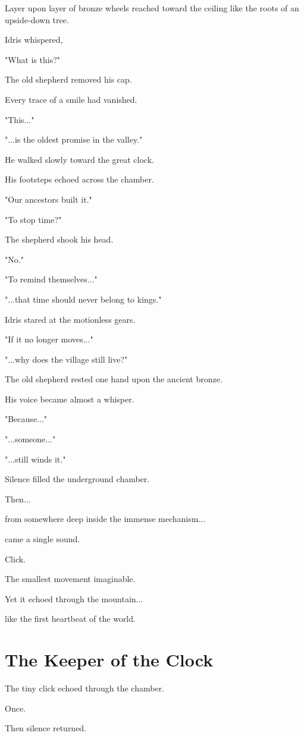 \documentclass[12pt,openany]{book}
\begin{document}
Layer upon layer of bronze wheels reached toward the ceiling like the roots of an upside-down tree.

Idris whispered,

"What is this?"

The old shepherd removed his cap.

Every trace of a smile had vanished.

"This..."

"...is the oldest promise in the valley."

He walked slowly toward the great clock.

His footsteps echoed across the chamber.

"Our ancestors built it."

"To stop time?"

The shepherd shook his head.

"No."

"To remind themselves..."

"...that time should never belong to kings."

Idris stared at the motionless gears.

"If it no longer moves..."

"...why does the village still live?"

The old shepherd rested one hand upon the ancient bronze.

His voice became almost a whisper.

"Because..."

"...someone..."

"...still winds it."

Silence filled the underground chamber.

Then...

from somewhere deep inside the immense mechanism...

came a single sound.

Click.

The smallest movement imaginable.

Yet it echoed through the mountain...

like the first heartbeat of the world.
\section*{The Keeper of the Clock}

The tiny click echoed through the chamber.

Once.

Then silence returned.
\end{document}
